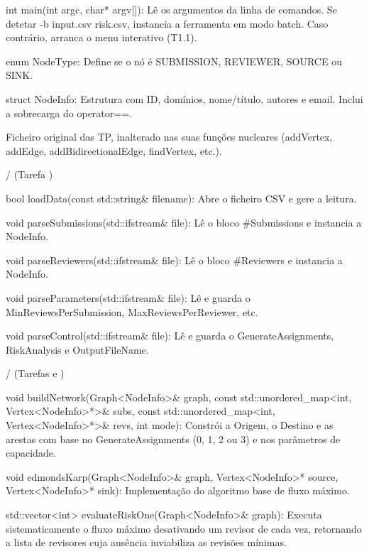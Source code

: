  \begin{DoxyVerb}int main(int argc, char* argv[]): Lê os argumentos da linha de comandos. Se detetar -b input.csv risk.csv, instancia a ferramenta em modo batch. Caso contrário, arranca o menu interativo (T1.1).
\end{DoxyVerb}
  \begin{DoxyVerb}enum NodeType: Define se o nó é SUBMISSION, REVIEWER, SOURCE ou SINK.

struct NodeInfo: Estrutura com ID, domínios, nome/título, autores e email. Inclui a sobrecarga do operator==.
\end{DoxyVerb}
  \begin{DoxyVerb}Ficheiro original das TP, inalterado nas suas funções nucleares (addVertex, addEdge, addBidirectionalEdge, findVertex, etc.).
\end{DoxyVerb}
  /  (Tarefa ) \begin{DoxyVerb}bool loadData(const std::string& filename): Abre o ficheiro CSV e gere a leitura.

void parseSubmissions(std::ifstream& file): Lê o bloco #Submissions e instancia a NodeInfo.

void parseReviewers(std::ifstream& file): Lê o bloco #Reviewers e instancia a NodeInfo.

void parseParameters(std::ifstream& file): Lê e guarda o MinReviewsPerSubmission, MaxReviewsPerReviewer, etc.

void parseControl(std::ifstream& file): Lê e guarda o GenerateAssignments, RiskAnalysis e OutputFileName.
\end{DoxyVerb}
  /  (Tarefas  e ) \begin{DoxyVerb}void buildNetwork(Graph<NodeInfo>& graph, const std::unordered_map<int, Vertex<NodeInfo>*>& subs, const std::unordered_map<int, Vertex<NodeInfo>*>& revs, int mode): Constrói a Origem, o Destino e as arestas com base no GenerateAssignments (0, 1, 2 ou 3) e nos parâmetros de capacidade.

void edmondsKarp(Graph<NodeInfo>& graph, Vertex<NodeInfo>* source, Vertex<NodeInfo>* sink): Implementação do algoritmo base de fluxo máximo.

std::vector<int> evaluateRiskOne(Graph<NodeInfo>& graph): Executa sistematicamente o fluxo máximo desativando um revisor de cada vez, retornando a lista de revisores cuja ausência inviabiliza as revisões mínimas.
\end{DoxyVerb}
